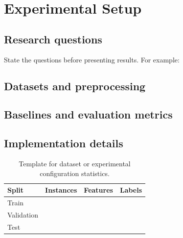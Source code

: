 \section{Experimental Setup}
\label{sec:experiments}

\subsection{Research questions}
State the questions before presenting results. For example:
\begin{description}[leftmargin=2.4em,style=nextline]
  \item[RQ1:] 
  \item[RQ2:] 
  \item[RQ3:] 
\end{description}

\subsection{Datasets and preprocessing}

\subsection{Baselines and evaluation metrics}

\subsection{Implementation details}

\begin{table}[t]
  \centering
  \caption{Template for dataset or experimental configuration statistics.}
  \label{tab:dataset-statistics}
  \begin{tabular}{lrrr}
    \toprule
    Split & Instances & Features & Labels \\
    \midrule
    Train & \placeholder{--} & \placeholder{--} & \placeholder{--} \\
    Validation & \placeholder{--} & \placeholder{--} & \placeholder{--} \\
    Test & \placeholder{--} & \placeholder{--} & \placeholder{--} \\
    \bottomrule
  \end{tabular}
\end{table}
